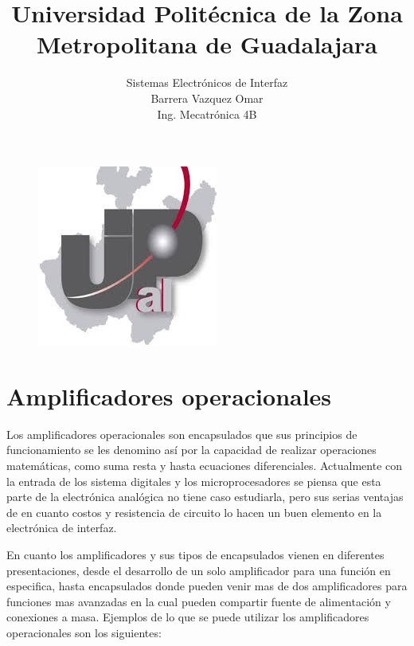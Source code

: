 \documentclass[11pt,a4paper]{article}
\title{Universidad Politécnica de la Zona Metropolitana de Guadalajara}
\begin{document}
\maketitle

\begin{figure}[h]
\begin{center}
\includegraphics[scale=1]{1.jpeg}
\end{center}
\end{figure}

\begin{center}
\author{Sistemas Electrónicos de Interfaz\\
Barrera Vazquez Omar\\
Ing. Mecatrónica 4B}
\end{center}

\newpage

\section{Amplificadores operacionales}

Los amplificadores operacionales son encapsulados que sus principios de funcionamiento se les denomino así por la capacidad de realizar operaciones matemáticas, como suma resta y hasta ecuaciones diferenciales. Actualmente con la entrada de los sistema digitales y los microprocesadores se piensa que esta parte de la electrónica analógica no tiene caso estudiarla, pero sus serias ventajas de en cuanto costos y resistencia de circuito lo hacen un buen elemento en la electrónica de interfaz.

En cuanto los amplificadores y sus tipos de encapsulados vienen en diferentes presentaciones, desde el desarrollo de un solo amplificador para una función en especifica, hasta encapsulados donde pueden venir mas de dos amplificadores para funciones mas avanzadas en la cual pueden compartir fuente de alimentación y conexiones a masa. Ejemplos de lo que se puede utilizar los amplificadores operacionales son los siguientes:
\end{document}
